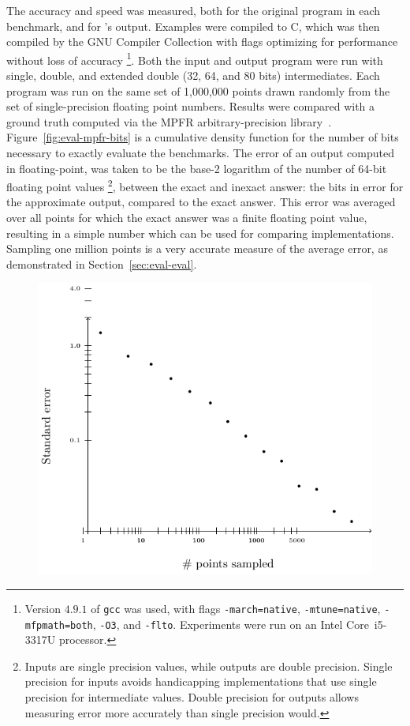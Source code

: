 \documentclass[paper.tex]{subfiles}
\begin{document}
The accuracy and speed was measured, both for the original program in
each benchmark, and for \casio's output.  Examples were compiled to C,
which was then compiled by the GNU Compiler Collection with flags
optimizing for performance without loss of accuracy%
\footnote{Version $4.9.1$ of \texttt{gcc} was used, with flags
  \texttt{-march=native}, \texttt{-mtune=native},
  \texttt{-mfpmath=both}, \texttt{-O3}, and \texttt{-flto}.
  Experiments were run on an Intel Core~i5-3317U processor.}.
  Both the input and output
program were run with single, double, and extended double (32, 64, and
80 bits) intermediates.  Each program was run on the same set of
1,000,000 points drawn randomly from the set of single-precision
floating point numbers.  Results were compared with a ground truth
computed via the MPFR arbitrary-precision library~\cite{acm07-mpfr}.
Figure~\ref{fig:eval-mpfr-bits} is a cumulative density function for
the number of bits necessary to exactly evaluate the benchmarks.  The
error of an output computed in floating-point, was taken to be the
base-2 logarithm of the number of 64-bit floating point values%
\footnote{Inputs are single precision values, while outputs are double
  precision.  Single precision for inputs avoids handicapping
  implementations that use single precision for intermediate values.
  Double precision for outputs allows measuring error more accurately
  than single precision would.}, between the exact and inexact answer:
the bits in error for the approximate output, compared to the exact
answer.  This error was averaged over all points for which the exact
answer was a finite floating point value, resulting in a simple number
which can be used for comparing implementations.  Sampling one million
points is a very accurate measure of the average error, as
demonstrated in Section~\ref{sec:eval-eval}.

\begin{figure}
\label{fig:eval-err}
\includegraphics[width=0.9\columnwidth]{fig/eval-err.pdf}
\caption{}
\end{figure}
\end{document}
